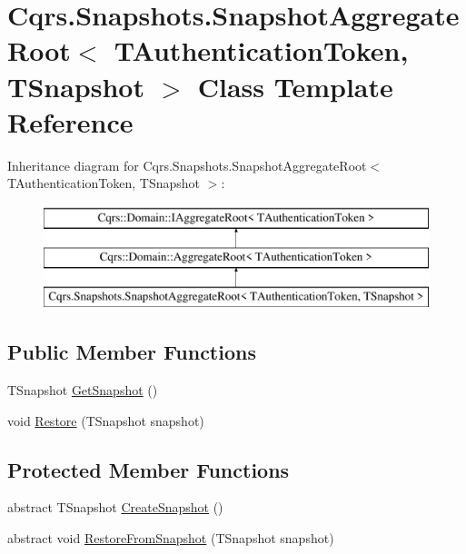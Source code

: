 \hypertarget{classCqrs_1_1Snapshots_1_1SnapshotAggregateRoot}{}\section{Cqrs.\+Snapshots.\+Snapshot\+Aggregate\+Root$<$ T\+Authentication\+Token, T\+Snapshot $>$ Class Template Reference}
\label{classCqrs_1_1Snapshots_1_1SnapshotAggregateRoot}
Inheritance diagram for Cqrs.\+Snapshots.\+Snapshot\+Aggregate\+Root$<$ T\+Authentication\+Token, T\+Snapshot $>$\+:\begin{figure}[H]
\begin{center}
\leavevmode
\includegraphics[height=3.000000cm]{classCqrs_1_1Snapshots_1_1SnapshotAggregateRoot}
\end{center}
\end{figure}
\subsection*{Public Member Functions}
\begin{DoxyCompactItemize}
\item 
T\+Snapshot \hyperlink{classCqrs_1_1Snapshots_1_1SnapshotAggregateRoot_a6116e565cb35cee459350a254bb2b893_a6116e565cb35cee459350a254bb2b893}{Get\+Snapshot} ()
\item 
void \hyperlink{classCqrs_1_1Snapshots_1_1SnapshotAggregateRoot_a58b1d2dc74a415526115f7e8240947d1_a58b1d2dc74a415526115f7e8240947d1}{Restore} (T\+Snapshot snapshot)
\end{DoxyCompactItemize}
\subsection*{Protected Member Functions}
\begin{DoxyCompactItemize}
\item 
abstract T\+Snapshot \hyperlink{classCqrs_1_1Snapshots_1_1SnapshotAggregateRoot_a2d8cd57c7b6c2696d286c6dc5e9f0479_a2d8cd57c7b6c2696d286c6dc5e9f0479}{Create\+Snapshot} ()
\item 
abstract void \hyperlink{classCqrs_1_1Snapshots_1_1SnapshotAggregateRoot_aefe31de169e33147439a69017a4fd3f7_aefe31de169e33147439a69017a4fd3f7}{Restore\+From\+Snapshot} (T\+Snapshot snapshot)
\end{DoxyCompactItemize}
